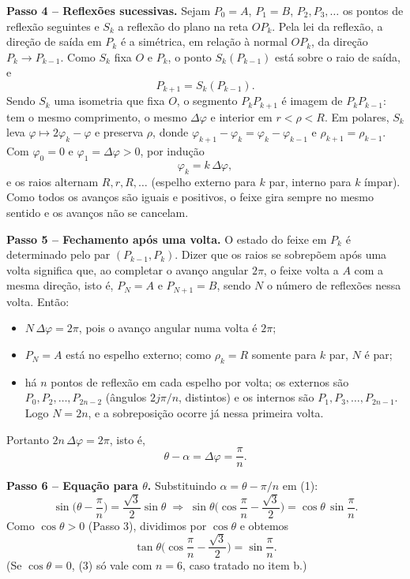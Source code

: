 \documentclass{article}%
\begin{document}
\textbf{Passo 4 -- Reflexões sucessivas.} Sejam $P_0=A$, $P_1=B$, $P_2,P_3,\dots$ os pontos de reflexão seguintes e $S_k$ a reflexão do plano na reta $OP_k$. Pela lei da reflexão, a direção de saída em $P_k$ é a simétrica, em relação à normal $OP_k$, da direção $P_k\to P_{k-1}$. Como $S_k$ fixa $O$ e $P_k$, o ponto $S_k(P_{k-1})$ está sobre o raio de saída, e
\[
P_{k+1}=S_k(P_{k-1}).
\]
Sendo $S_k$ uma isometria que fixa $O$, o segmento $P_kP_{k+1}$ é imagem de $P_kP_{k-1}$: tem o mesmo comprimento, o mesmo $\Delta\varphi$ e interior em $r<\rho<R$. Em polares, $S_k$ leva $\varphi\mapsto 2\varphi_k-\varphi$ e preserva $\rho$, donde $\varphi_{k+1}-\varphi_k=\varphi_k-\varphi_{k-1}$ e $\rho_{k+1}=\rho_{k-1}$. Com $\varphi_0=0$ e $\varphi_1=\Delta\varphi>0$, por indução
\[
\varphi_k=k\,\Delta\varphi ,
\]
e os raios alternam $R,r,R,\dots$ (espelho externo para $k$ par, interno para $k$ ímpar). Como todos os avanços são iguais e positivos, o feixe gira sempre no mesmo sentido e os avanços não se cancelam.

\textbf{Passo 5 -- Fechamento após uma volta.} O estado do feixe em $P_k$ é determinado pelo par $(P_{k-1},P_k)$. Dizer que os raios se sobrepõem após uma volta significa que, ao completar o avanço angular $2\pi$, o feixe volta a $A$ com a mesma direção, isto é, $P_N=A$ e $P_{N+1}=B$, sendo $N$ o número de reflexões nessa volta. Então:
\begin{itemize}
\item $N\,\Delta\varphi=2\pi$, pois o avanço angular numa volta é $2\pi$;
\item $P_N=A$ está no espelho externo; como $\rho_k=R$ somente para $k$ par, $N$ é par;
\item há $n$ pontos de reflexão em cada espelho por volta; os externos são $P_0,P_2,\dots,P_{2n-2}$ (ângulos $2j\pi/n$, distintos) e os internos são $P_1,P_3,\dots,P_{2n-1}$. Logo $N=2n$, e a sobreposição ocorre já nessa primeira volta.
\end{itemize}
Portanto $2n\,\Delta\varphi=2\pi$, isto é,
\[
\theta-\alpha=\Delta\varphi=\frac{\pi}{n}. \tag{2}
\]

\textbf{Passo 6 -- Equação para $\theta$.} Substituindo $\alpha=\theta-\pi/n$ em (1):
\[
\sin\Big(\theta-\frac{\pi}{n}\Big)=\frac{\sqrt3}{2}\sin\theta
\;\Longrightarrow\;
\sin\theta\Big(\cos\frac{\pi}{n}-\frac{\sqrt3}{2}\Big)=\cos\theta\,\sin\frac{\pi}{n}. \tag{3}
\]
Como $\cos\theta>0$ (Passo 3), dividimos por $\cos\theta$ e obtemos
\[
\tan\theta\Big(\cos\frac{\pi}{n}-\frac{\sqrt3}{2}\Big)=\sin\frac{\pi}{n}. \tag{4}
\]
(Se $\cos\theta=0$, (3) só vale com $n=6$, caso tratado no item b.)
\end{document}
